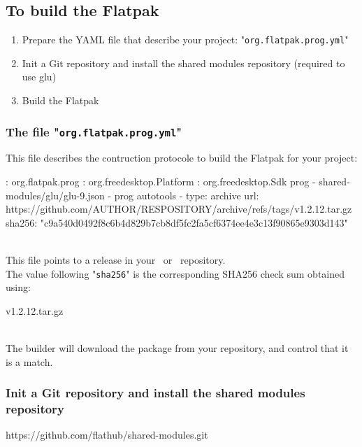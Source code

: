 \subsection{To build the Flatpak}

\begin{enumerate}
\item Prepare the YAML file that describe your project: "\texttt{org.flatpak.prog.yml}"
\item Init a Git repository and install the shared modules repository (required to use glu)
\item Build the Flatpak
\end{enumerate}

\subsubsection{The file "\texttt{org.flatpak.prog.yml}"}

This file describes the contruction protocole to build the Flatpak for your project:
{\footnotesize{
\begin{script}
: org.flatpak.prog
: org.freedesktop.Platform
: 
 org.freedesktop.Sdk
 prog
  - shared-modules/glu/glu-9.json
  -  prog
     autotools
     
      - type: archive
        url: https://github.com/AUTHOR/RESPOSITORY/archive/refs/tags/v1.2.12.tar.gz
        sha256: "c9a540d0492f8c6b4d829b7cb8df5fc2fa5cf6374ee4e3c13f90865e9303d143"
\end{script}
}}
\\[-0.5cm]
\noindent This file points to a release in your \github\ or \gitlab\ repository. \\
The value following "\texttt{sha256}" is the corresponding SHA256 check sum obtained using: 
\begin{script}
 v1.2.12.tar.gz
\end{script} \\[-0.5cm]
\noindent
The builder will download the package from your repository, and control that it is a match. 

\subsubsection{Init a Git repository and install the shared modules repository}

{\footnotesize{
\begin{script}
 
   https://github.com/flathub/shared-modules.git
\end{script}
}}
\newpage

